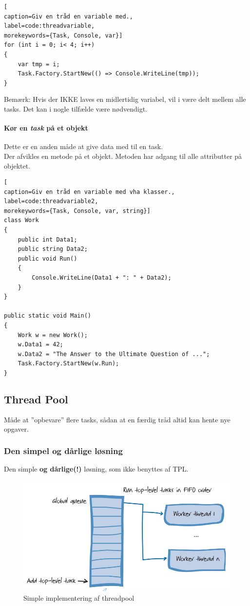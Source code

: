 \begin{lstlisting}[
caption=Giv en tråd en variable med.,
label=code:threadvariable,
morekeywords={Task, Console, var}]
for (int i = 0; i< 4; i++)
{
	var tmp = i;
	Task.Factory.StartNew(() => Console.WriteLine(tmp));
}
\end{lstlisting}

Bemærk: Hvis der IKKE laves en midlertidig variabel, vil i være delt mellem alle tasks. Det kan i nogle tilfælde være nødvendigt.

\paragraph{Kør en \textit{task} på et objekt}
Dette er en anden måde at give data med til en task.\\

Der afvikles en metode på et objekt. Metoden har adgang til alle attributter på objektet.

\begin{lstlisting}[
caption=Giv en tråd en variable med vha klasser.,
label=code:threadvariable2,
morekeywords={Task, Console, var, string}]
class Work
{
	public int Data1;
	public string Data2;
	public void Run()
	{
		Console.WriteLine(Data1 + ": " + Data2);
	}
}

public static void Main()
{
	Work w = new Work();
	w.Data1 = 42;
	w.Data2 = "The Answer to the Ultimate Question of ...";
	Task.Factory.StartNew(w.Run);
}
\end{lstlisting}

\subsection{Thread Pool}
Måde at ''opbevare'' flere tasks, sådan at en færdig tråd altid kan hente nye opgaver.

\subsubsection{Den simpel og dårlige løsning}
Den simple \textbf{og dårlige(!)} løsning, som ikke benyttes af TPL. 

\begin{figure}[h]
	\centering
	\includegraphics[width=0.7\linewidth]{figs/badthreadpool}
	\caption{Simple implementering af threadpool}
	\label{fig:badthreadpool}
\end{figure}


